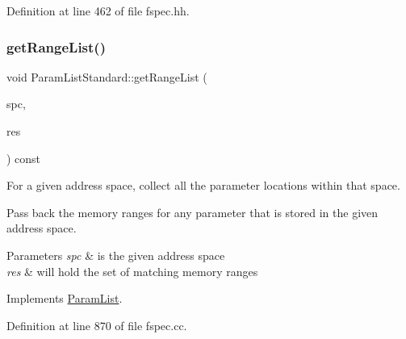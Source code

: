 Definition at line 462 of file fspec.\+hh.

\mbox{\label{class_param_list_standard_a715b7fc4875a69e7e5b8b498002f03de}} 
\subsubsection{\texorpdfstring{getRangeList()}{getRangeList()}}
{\footnotesize\ttfamily void Param\+List\+Standard\+::get\+Range\+List (\begin{DoxyParamCaption}\item[{\mbox{\hyperlink{class_addr_space}{Addr\+Space}} $\ast$}]{spc,  }\item[{\mbox{\hyperlink{class_range_list}{Range\+List}} \&}]{res }\end{DoxyParamCaption}) const\hspace{0.3cm}{\ttfamily [virtual]}}



For a given address space, collect all the parameter locations within that space. 

Pass back the memory ranges for any parameter that is stored in the given address space. 
\begin{DoxyParams}{Parameters}
{\em spc} & is the given address space \\
\hline
{\em res} & will hold the set of matching memory ranges \\
\hline
\end{DoxyParams}


Implements \mbox{\hyperlink{class_param_list_a35f41fbd1143cba10bd81cd5a81ad476}{Param\+List}}.



Definition at line 870 of file fspec.\+cc.

